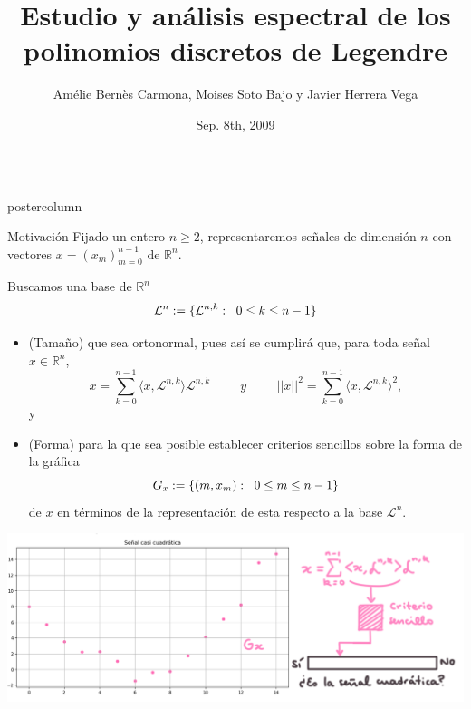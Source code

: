 \documentclass[final,hyperref={pdfpagelabels=false}]{beamer}
\title{\huge Estudio y an\'alisis espectral de los polinomios discretos de Legendre}
\author{Am\'elie Bern\`es Carmona, Moises Soto Bajo y Javier Herrera Vega}
\institute[BUAP]{Benem\'erita Universidad Auton\'oma de Puebla}
\date[Sep. 8th, 2009]{Sep. 8th, 2009}
\newcommand{\IR}{\mathbb{R}}
\newcommand{\suma}[3]{\sum\limits_{#1}^{#2}#3} %
\newcommand{\cali}[1]{\mathcal{#1}} %
\newlength{\columnheight}
\begin{document}
\begin{frame}
  \begin{columns}
    \begin{column}{.49\textwidth}
      \begin{beamercolorbox}[center,wd=\textwidth]{postercolumn}
                              
            \begin{block}{Motivaci\'on}
            Fijado un entero $n \geq 2$, representaremos se\~nales
            de dimensi\'on $n$ con vectores $x = (x_{m})_{m=0}^{n-1}$
            de $\IR^{n}$.
     
            Buscamos una base de $\IR^{n}$
            $$\cali{L}^{n} := \{ \cali{L}^{n,k} : \hspace{0.2cm} 0 \leq k \leq n-1 \}$$
              \begin{itemize}
              
             \item (\textcolor{i6colorblockbg}{Tama\~no}) 
			que sea ortonormal, pues as\'i se cumplir\'a que,
			para toda se\~nal $x \in \IR^{n}$, 
			\[
			x = \suma{k=0}{n-1}{\langle x, \cali{L}^{n,k} \rangle \cali{L}^{n,k}}
			\hspace{1cm} \textit{y} \hspace{1cm}
			||x||^{2} = \suma{k=0}{n-1}{\langle x, \cali{L}^{n,k} \rangle^{2}},
			\]
			y
	           
	        \item (\textcolor{i6colorblockbg}{Forma}) 
	        para la que sea posible establecer criterios
			sencillos sobre la forma de la gr\'afica  
			\[
			G_{x} := \{ (m, x_{m}): \hspace{0.2cm} 0 \leq m \leq n-1 \}
			\]			
			de $x$ en t\'erminos
			de la representaci\'on de esta respecto a la base $\cali{L}^{n}$.
               \end{itemize}
               
            \includegraphics[width=0.95\linewidth]{cuadr2}
            \end{block}
            \vfill
		    \vspace{1cm}            
  

\end{beamercolorbox}
\end{column}
\end{columns}
\end{frame}
\end{document}

